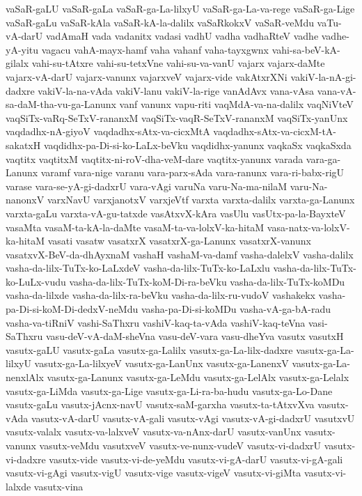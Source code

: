 {vaSaR-gaLU
vaSaR-gaLa
vaSaR-ga-La-lilxyU
vaSaR-ga-La-va-rege
vaSaR-ga-Lige
vaSaR-gaLu
vaSaR-kAla
vaSaR-kA-la-dalilx
vaSaRkokxV
vaSaR-veMdu
vaTu-vA-darU
vadAmaH
vada
vadanitx
vadasi
vadhU
vadha
vadhaRteV
vadhe
vadhe-yA-yitu
vagacu
vahA-mayx-hamf
vaha
vahanf
vaha-tayxgwnx
vahi-sa-beV-kA-gilalx
vahi-su-tAtxre
vahi-su-tetxVne
vahi-su-va-vanU
vajarx
vajarx-daMte
vajarx-vA-darU
vajarx-vanunx
vajarxveV
vajarx-vide
vakAtxrXNi
vakiV-la-nA-gi-dadxre
vakiV-la-na-vAda
vakiV-lanu
vakiV-la-rige
vanAdAvx
vana-vAsa
vana-vA-sa-daM-tha-vu-ga-Lanunx
vanf
vanunx
vapu-riti
vaqMdA-va-na-dalilx
vaqNiVteV
vaqSiTx-vaRq-SeTxV-rananxM
vaqSiTx-vaqR-SeTxV-rananxM
vaqSiTx-yanUnx
vaqdadhx-nA-giyoV
vaqdadhx-sAtx-va-cicxMtA
vaqdadhx-sAtx-va-cicxM-tA-sakatxH
vaqdidhx-pa-Di-si-ko-LaLx-beVku
vaqdidhx-yanunx
vaqkaSx
vaqkaSxda
vaqtitx
vaqtitxM
vaqtitx-ni-roV-dha-veM-dare
vaqtitx-yanunx
varada
vara-ga-Lanunx
varamf
vara-nige
varanu
vara-parx-sAda
vara-ranunx
vara-ri-babx-rigU
varase
vara-se-yA-gi-dadxrU
vara-vAgi
varuNa
varu-Na-ma-nilaM
varu-Na-nanonxV
varxNavU
varxjanotxV
varxjeVtf
varxta
varxta-dalilx
varxta-ga-Lanunx
varxta-gaLu
varxta-vA-gu-tatxde
vasAtxvX-kAra
vasUlu
vasUtx-pa-la-BayxteV
vasaMta
vasaM-ta-kA-la-daMte
vasaM-ta-va-lolxV-ka-hitaM
vasa-natx-va-lolxV-ka-hitaM
vasati
vasatw
vasatxrX
vasatxrX-ga-Lanunx
vasatxrX-vanunx
vasatxvX-BeV-da-dhAyxnaM
vashaH
vashaM-va-damf
vasha-dalelxV
vasha-dalilx
vasha-da-lilx-TuTx-ko-LaLxdeV
vasha-da-lilx-TuTx-ko-LaLxlu
vasha-da-lilx-TuTx-ko-LuLx-vudu
vasha-da-lilx-TuTx-koM-Di-ra-beVku
vasha-da-lilx-TuTx-koMDu
vasha-da-lilxde
vasha-da-lilx-ra-beVku
vasha-da-lilx-ru-vudoV
vashakekx
vasha-pa-Di-si-koM-Di-dedxV-neMdu
vasha-pa-Di-si-koMDu
vasha-vA-ga-bA-radu
vasha-va-tiRniV
vashi-SaThxru
vashiV-kaq-ta-vAda
vashiV-kaq-teVna
vasi-SaThxru
vasu-deV-vA-daM-sheVna
vasu-deV-vara
vasu-dheYva
vasutx
vasutxH
vasutx-gaLU
vasutx-gaLa
vasutx-ga-Lalilx
vasutx-ga-La-lilx-dadxre
vasutx-ga-La-lilxyU
vasutx-ga-La-lilxyeV
vasutx-ga-LanUnx
vasutx-ga-LanenxV
vasutx-ga-La-nenxlAlx
vasutx-ga-Lanunx
vasutx-ga-LeMdu
vasutx-ga-LelAlx
vasutx-ga-Lelalx
vasutx-ga-LiMda
vasutx-ga-Lige
vasutx-ga-Li-ra-ba-hudu
vasutx-ga-Lo-Dane
vasutx-gaLu
vasutx-jAcnx-navU
vasutx-saM-garxha
vasutx-ta-tAtxvXva
vasutx-vAda
vasutx-vA-darU
vasutx-vA-gali
vasutx-vAgi
vasutx-vA-gi-dadxrU
vasutxvU
vasutx-valalx
vasutx-va-lalxveV
vasutx-va-nAnx-darU
vasutx-vanUnx
vasutx-vanunx
vasutx-veMdu
vasutxveV
vasutx-ve-nunx-vudeV
vasutx-vi-dadxrU
vasutx-vi-dadxre
vasutx-vide
vasutx-vi-de-yeMdu
vasutx-vi-gA-darU
vasutx-vi-gA-gali
vasutx-vi-gAgi
vasutx-vigU
vasutx-vige
vasutx-vigeV
vasutx-vi-giMta
vasutx-vi-lalxde
vasutx-vina
}
